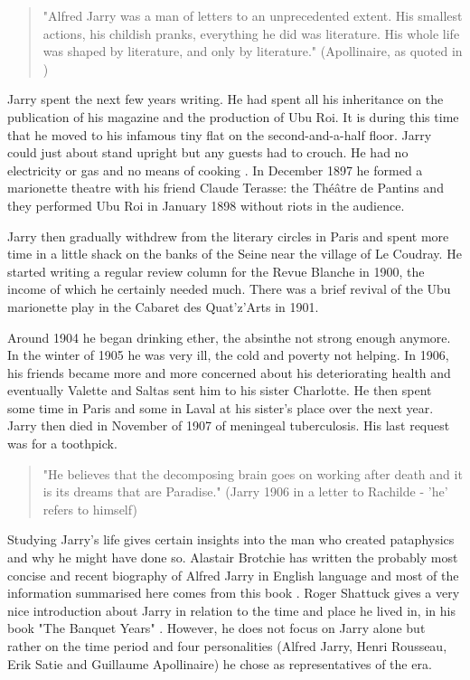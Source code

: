 \begin{quote}
  "Alfred Jarry was a man of letters to an unprecedented extent. His smallest actions, his childish pranks, everything he did was literature. His whole life was shaped by literature, and only by literature." (Apollinaire, as quoted in \citep[p.307]{Brotchie2011})
\end{quote}

Jarry spent the next few years writing. He had spent all his inheritance on the publication of his magazine and the production of Ubu Roi. It is during this time that he moved to his infamous tiny flat on the second-and-a-half floor. Jarry could just about stand upright but any guests had to crouch. He had no electricity or gas and no means of cooking \citep[p.195]{Brotchie2011}. In December 1897 he formed a marionette theatre with his friend Claude Terasse: the Théâtre de Pantins and they performed Ubu Roi in January 1898 without riots in the audience.

Jarry then gradually withdrew from the literary circles in Paris and spent more time in a little shack on the banks of the Seine near the village of Le Coudray. He started writing a regular review column for the Revue Blanche in 1900, the income of which he certainly needed much. There was a brief revival of the Ubu marionette play in the Cabaret des Quat'z'Arts in 1901.

Around 1904 he began drinking ether, the absinthe not strong enough anymore. In the winter of 1905 he was very ill, the cold and poverty not helping. In 1906, his friends became more and more concerned about his deteriorating health and eventually Valette and Saltas sent him to his sister Charlotte. He then spent some time in Paris and some in Laval at his sister's place over the next year. Jarry then died in November of 1907 of meningeal tuberculosis. His last request was for a toothpick.

\begin{quote}
  "He believes that the decomposing brain goes on working after death and it is its dreams that are Paradise." (Jarry 1906 in a letter to Rachilde \citep{Brotchie2007} - 'he' refers to himself)
\end{quote}

Studying Jarry's life gives certain insights into the man who created pataphysics and why he might have done so. Alastair Brotchie has written the probably most concise and recent biography of Alfred Jarry in English language and most of the information summarised here comes from this book \citep{Brotchie2011}. Roger Shattuck gives a very nice introduction about Jarry in relation to the time and place he lived in, in his book "The Banquet Years" \citep{Shattuck1959}. However, he does not focus on Jarry alone but rather on the time period and four personalities (Alfred Jarry, Henri Rousseau, Erik Satie and Guillaume Apollinaire) he chose as representatives of the era.



